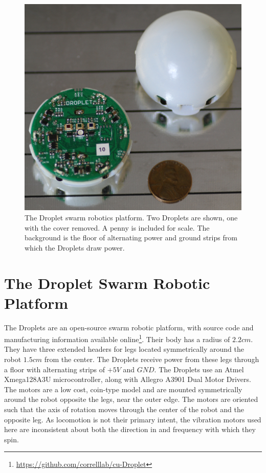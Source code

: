 \documentclass[letterpaper, 10pt, conference]{ieeeconf}
\begin{document}
\begin{figure}[!htb]
	\centering
		\includegraphics[width=0.8\columnwidth]{./Images/Droplets.png}
	\caption{The Droplet swarm robotics platform. Two Droplets are shown, one with the cover removed. A penny is included for scale. The background is the floor of alternating power and ground strips from which the Droplets draw power.}
	\label{Droplets}
\end{figure}


\section{The Droplet Swarm Robotic Platform}
The Droplets are an open-source swarm robotic platform, with source code and manufacturing information available online\footnote{\url{https://github.com/correlllab/cu-Droplet}}. Their body has a radius of $2.2cm$. They have three extended headers for legs located symmetrically around the robot $1.5cm$ from the center. The Droplets receive power from these legs through a floor with alternating strips of $+5V$ and $GND$. The Droplets use an Atmel Xmega128A3U microcontroller, along with Allegro A3901 Dual Motor Drivers. The motors are a low cost, coin-type model and are mounted symmetrically around the robot opposite the legs, near the outer edge. The motors are oriented such that the axis of rotation moves through the center of the robot and the opposite leg. As locomotion is not their primary intent, the vibration motors used here are inconsistent about both the direction in and frequency with which they spin.
\end{document}
